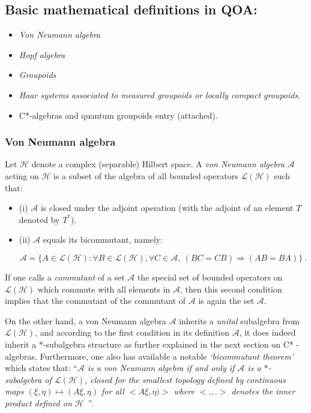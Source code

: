 \documentclass[12pt]{article}
\theoremstyle{plain}
\theoremstyle{definition}
\numberwithin{equation}{section}
\newcommand{\A}{\mathcal A}
\renewcommand{\H}{\mathcal H}
\renewcommand{\cL}{\mathcal L}
\newcommand{\<}{{\langle}}
\begin{document}
\subsection{Basic mathematical definitions in QOA: }

\begin{itemize} 
\item {\em Von Neumann algebra}

\item {\em Hopf algebra}

\item {\em Groupoids}

\item {\em Haar systems associated to measured groupoids or locally compact groupoids.}
\item C*-algebras and quantum groupoids entry (attached). 
\end{itemize}

\subsubsection{Von Neumann algebra}

 Let $\H$ denote a complex (separable) Hilbert space. A \emph{von Neumann algebra} $\A$ acting on $\H$ is a subset of the algebra of all bounded operators $\cL(\H)$ such that:

\begin{itemize}

\item  (i) $\A$ is closed under the adjoint operation (with the
adjoint of an element $T$ denoted by $T^*$).

\item  (ii) $\A$ equals its bicommutant, namely:

\begin{equation}
\A= \{A \in \cL(\H) : \forall B \in \cL(\H), \forall C\in \A,~
(BC=CB)\Rightarrow (AB=BA)\}~.
\end{equation}
\end{itemize}

 If one calls a \emph{commutant} of a set $\A$ the special set of
bounded operators on $\cL(\H)$ which commute with all elements in
$\A$, then this second condition implies that the commutant of the
commutant of $\A$ is again the set $\A$.

 On the other hand, a von Neumann algebra $\A$ inherits a
\emph{unital} subalgebra from $\cL(\H)$, and according to the
first condition in its definition $\A$, it does indeed inherit a
$*$-subalgebra structure as further explained in the next
section on C* -algebras. Furthermore, one also has available a notable
\emph{`bicommutant theorem'} which states that: ``{\em $\A$ is a von
Neumann algebra if and only if $\A$ is a $*$-subalgebra of
$\cL(\H)$, closed for the smallest topology defined by continuous
maps $(\xi,\eta)\longmapsto (A\xi,\eta)$ for all $<A\xi,\eta)>$
where $<.,.>$ denotes the inner product defined on $\H$}~''. 
\end{document}
